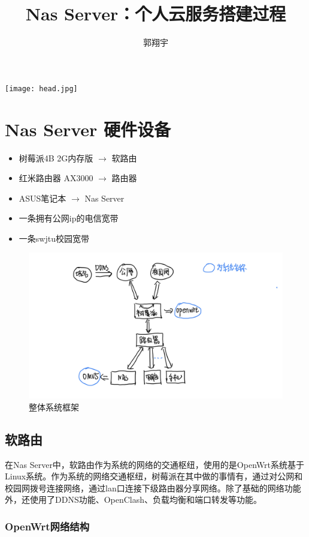 \documentclass[cn,hazy,blue,10.5pt,normal]{elegantnote}
\title{Nas Server：个人云服务搭建过程}
\author{郭翔宇}
\institute{\LaTeX{} Program}
\date{\zhtoday}
\begin{document}
\maketitle

\centerline{
  \texttt{[image: head.jpg]}
}

\newpage
\section{Nas Server 硬件设备}

\begin{itemize}
  \item 树莓派4B 2G内存版 $\rightarrow$ 软路由
  \item 红米路由器 AX3000 $\rightarrow$ 路由器
  \item ASUS笔记本 $\rightarrow$ Nas Server
  \item 一条拥有公网ip的电信宽带
  \item 一条swjtu校园宽带
\end{itemize}

\begin{figure}[!htb]
  \centering
  \includegraphics[scale=0.25]{image/系统架构.PNG}
  \caption{整体系统框架}
\end{figure}

\subsection{软路由}

在Nas Server中，软路由作为系统的网络的交通枢纽，使用的是OpenWrt系统基于Linux系统。作为系统的网络交通枢纽，树莓派在其中做的事情有，通过对公网和校园网拨号连接网络，通过lan口连接下级路由器分享网络。除了基础的网络功能外，还使用了DDNS功能、OpenClash、负载均衡和端口转发等功能。

\subsubsection{OpenWrt网络结构}
\end{document}
